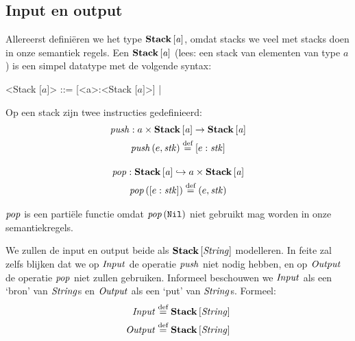 \subsection{Input en output}
\label{sec:def:io}

Allereerst definiëren we het type $\mathbf{Stack}\left[\mathit{a}\right]$, omdat stacks we veel met stacks
doen in onze semantiek regels. Een $\mathbf{Stack}\left[\mathit{a}\right]$ (lees: een stack van elementen
van type $a$) is een simpel datatype met de volgende syntax:

\def\inbrackets#1{$\mathrm{[}#1\mathrm{]}$}
\def\bracka{\inbrackets{a}}
\begin{grammar}
	<Stack \bracka> ::= [<a>:<Stack \bracka>] | \Nil
\end{grammar}

Op een stack zijn twee instructies gedefinieerd:
\begin{gather*}
	\mathit{push} : a \times \mathbf{Stack}\left[\mathit{a}\right] \to \mathbf{Stack}\left[\mathit{a}\right] \\
	\mathit{push}\left(e, \mathit{stk}\right) \stackrel{\text{def}}{=} [e:\mathit{stk}] \\[1em]
	\mathit{pop} : \mathbf{Stack}\left[\mathit{a}\right] \hookrightarrow a \times \mathbf{Stack}\left[\mathit{a}\right] \\
	\mathit{pop}\left([e:\mathit{stk}]\right) \stackrel{\text{def}}{=} (e,\mathit{stk}) \\
\end{gather*}

$\mathit{pop}$ is een partiële functie omdat $\mathit{pop}\left(\texttt{Nil}\right)$ niet gebruikt mag worden in
onze semantiekregels. %

\medskip
We zullen de input en output beide als $\mathbf{Stack}\left[\mathit{\mathit{String}}\right]$ modelleren. In feite
zal zelfs blijken dat we op $\mathit{Input}$ de operatie $\mathit{push}$ niet nodig hebben,
en op $\mathit{Output}$ de operatie $\mathit{pop}$ niet zullen gebruiken. Informeel
beschouwen we $\mathit{Input}$ als een `bron' van $\mathit{String}$s en $\mathit{Output}$ als een `put'
van $\mathit{String}$s. Formeel:
\begin{align*}
	\mathit{Input} &\stackrel{\text{def}}{=} \mathbf{Stack}\left[\mathit{\mathit{String}}\right] \\ \mathit{Output} &\stackrel{\text{def}}{=} \mathbf{Stack}\left[\mathit{\mathit{String}}\right]
\end{align*}

